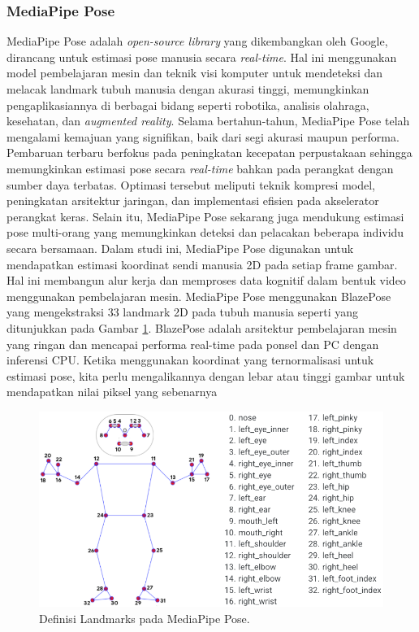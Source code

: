 \subsubsection{MediaPipe Pose}
\label{subsec:mediapipepose}

MediaPipe Pose adalah \emph{open-source library} yang dikembangkan oleh Google, dirancang untuk estimasi pose manusia secara \emph{real-time}. Hal ini menggunakan model pembelajaran mesin dan teknik visi komputer untuk mendeteksi dan melacak landmark tubuh manusia dengan akurasi tinggi, memungkinkan pengaplikasiannya di berbagai bidang seperti robotika, analisis olahraga, kesehatan, dan \emph{augmented reality}.
Selama bertahun-tahun, MediaPipe Pose telah mengalami kemajuan yang signifikan, baik dari segi akurasi maupun performa. Pembaruan terbaru berfokus pada peningkatan kecepatan perpustakaan sehingga memungkinkan estimasi pose secara \emph{real-time} bahkan pada perangkat dengan sumber daya terbatas. Optimasi tersebut meliputi teknik kompresi model, peningkatan arsitektur jaringan, dan implementasi efisien pada akselerator perangkat keras. Selain itu, MediaPipe Pose sekarang juga mendukung estimasi pose multi-orang yang memungkinkan deteksi dan pelacakan beberapa individu secara bersamaan.
Dalam studi ini, MediaPipe Pose digunakan untuk mendapatkan estimasi koordinat sendi manusia 2D pada setiap frame gambar. Hal ini membangun alur kerja dan memproses data kognitif dalam bentuk video menggunakan pembelajaran mesin. MediaPipe Pose menggunakan BlazePose yang mengekstraksi 33 landmark 2D pada tubuh manusia seperti yang ditunjukkan pada Gambar \ref{fig:mediapipe-landmark}. BlazePose adalah arsitektur pembelajaran mesin yang ringan dan mencapai performa real-time pada ponsel dan PC dengan inferensi CPU.
Ketika menggunakan koordinat yang ternormalisasi untuk estimasi pose, kita perlu mengalikannya dengan lebar atau tinggi gambar untuk mendapatkan nilai piksel yang sebenarnya

\begin{figure}[ht]
  \centering
  \includegraphics[scale=0.4]{gambar/mediapipe_landmark.png}
  \caption{Definisi Landmarks pada MediaPipe Pose.}
  \label{fig:mediapipe-landmark}
\end{figure}

